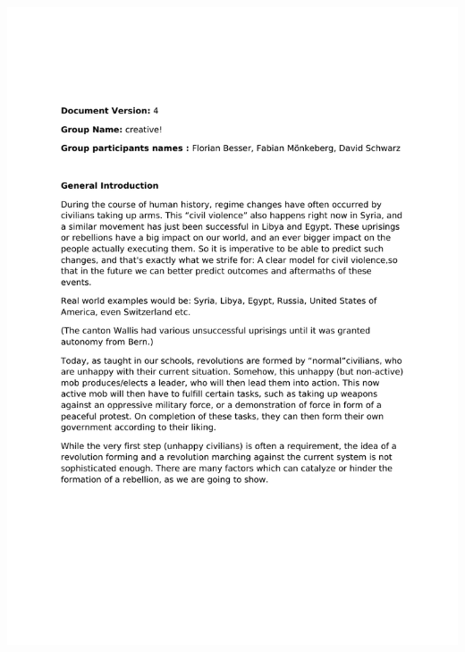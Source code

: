 \documentclass[11pt]{article}
\begin{document}
\includegraphics[bb=1.0in 1.0in 7.5in 10in,page=1]{Proposal.pdf}
\newpage
\end{document}
